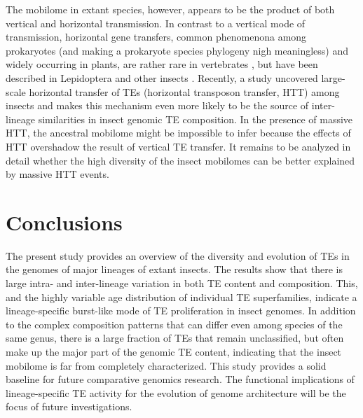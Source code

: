 The mobilome in extant species, however, appears to be the product of
both vertical and horizontal transmission. In contrast to a vertical
mode of transmission, horizontal gene transfers, common phenomenona
among prokaryotes (and making a prokaryote species phylogeny nigh
meaningless) and widely occurring in plants, are rather rare in
vertebrates \citep{Syvanen2012,Wallau2012}, but have been described in
Lepidoptera \citep{Sormacheva2012} and other insects
\citep{Nakabachi2015}. Recently, a study uncovered large-scale
horizontal transfer of TEs (horizontal transposon transfer, HTT) among
insects \citep{Peccoud2017} and makes this mechanism even more likely to
be the source of inter-lineage similarities in insect genomic TE
composition. In the presence of massive HTT, the ancestral mobilome
might be impossible to infer because the effects of HTT overshadow the
result of vertical TE transfer. It remains to be analyzed in detail
whether the high diversity of the insect mobilomes can be better
explained by massive HTT events.

\section{Conclusions}

The present study provides an overview of the diversity and evolution of
TEs in the genomes of major lineages of extant insects.  The results
show that there is large intra- and inter-lineage variation in both TE
content and composition.  This, and the highly variable age distribution
of individual TE superfamilies, indicate a lineage-specific burst-like
mode of TE proliferation in insect genomes.  In addition to the complex
composition patterns that can differ even among species of the same
genus, there is a large fraction of TEs that remain unclassified, but
often make up the major part of the genomic TE content, indicating that
the insect mobilome is far from completely characterized.  This study
provides a solid baseline for future comparative genomics research.  The
functional implications of lineage-specific TE activity for the
evolution of genome architecture will be the focus of future
investigations.




